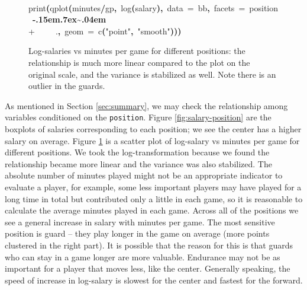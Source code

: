 \documentclass[english]{article}
\newenvironment{dummy}{\par}{\par}
\newcommand{\hlfunctioncall}[1]{\textcolor[rgb]{1,0,0}{#1}}%
\newcommand{\hlstring}[1]{\textcolor[rgb]{0.6,0.6,1}{#1}}%
\newcommand{\hlkeyword}[1]{\textcolor[rgb]{0,0,0}{\textbf{#1}}}%
\newcommand{\hlargument}[1]{\textcolor[rgb]{0.694117647058824,0.247058823529412,0.0196078431372549}{#1}}%
\newcommand{\hlsymbol}[1]{\textcolor[rgb]{0,0,0}{#1}}%
\newcommand{\hlprompt}[1]{\textcolor[rgb]{0,0,0}{#1}}%
\def\urltilda{\kern -.15em\lower .7ex\hbox{\~{}}\kern .04em}%
\newcommand{\hlstd}[1]{\textcolor[rgb]{0,0,0}{#1}}%
\begin{document}
%
\begin{figure}
\begin{dummy}
\hspace*{\fill}\\
\hlstd{}\ttfamily\noindent
\hlprompt{\usebox{\hlnormalsizeboxgreaterthan}{\ }}\hlfunctioncall{print}\hlkeyword{(}\hlfunctioncall{qplot}\hlkeyword{(}\hlsymbol{minutes}\hlkeyword{/}\hlsymbol{gp}\hlkeyword{,}{\ }\hlfunctioncall{log}\hlkeyword{(}\hlsymbol{salary}\hlkeyword{)}\hlkeyword{,}{\ }\hlargument{data}{\ }\hlargument{=}{\ }\hlsymbol{bb}\hlkeyword{,}{\ }\hlargument{facets}{\ }\hlargument{=}{\ }\hlsymbol{position}{\ }\hlkeyword{\urltilda{}}\hspace*{\fill}\\
\hlstd{}\hlprompt{+{\ }}{\ }{\ }{\ }{\ }\hlsymbol{.}\hlkeyword{,}{\ }\hlargument{geom}{\ }\hlargument{=}{\ }\hlfunctioncall{c}\hlkeyword{(}\hlstring{"point"}\hlkeyword{,}{\ }\hlstring{"smooth"}\hlkeyword{)}\hlkeyword{)}\hlkeyword{)}\mbox{}
\normalfont
\hspace*{\fill}\\
\hlstd{}
\begin{center}


\endpgfgraphicnamed
\end{center}
\end{dummy}
\caption{Log-salaries vs minutes per game for different positions: the relationship
is much more linear compared to the plot on the original scale, and
the variance is stabilized as well. Note there is an outlier in the
guards.\label{fig:salary-minpergp}}

\end{figure}


As mentioned in Section \ref{sec:summary}, we may check the relationship
among variables conditioned on the \texttt{position}. Figure \ref{fig:salary-position}
are the boxplots of salaries corresponding to each position; we see
the center has a higher salary on average. Figure \ref{fig:salary-minpergp}
is a scatter plot of log-salary vs minutes per game for different
positions. We took the log-transformation because we found the relationship
became more linear and the variance was also stabilized. The absolute
number of minutes played might not be an appropriate indicator to
evaluate a player, for example, some less important players may have
played for a long time in total but contributed only a little in each
game, so it is reasonable to calculate the average minutes played
in each game. Across all of the positions we see a general increase
in salary with minutes per game. The most sensitive position is guard
-- they play longer in the game on average (more points clustered
in the right part). It is possible that the reason for this is that
guards who can stay in a game longer are more valuable. Endurance
may not be as important for a player that moves less, like the center.
Generally speaking, the speed of increase in log-salary is slowest
for the center and fastest for the forward.
\end{document}
